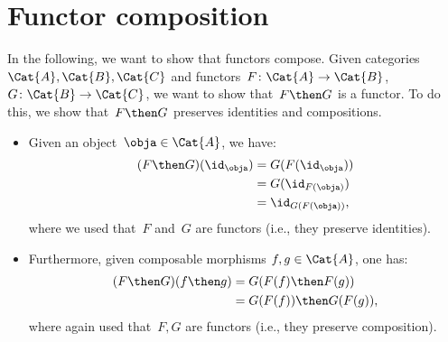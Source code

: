 

\section{Functor composition}


In the following, we want to show that functors compose.
Given categories~$\Cat{A},\Cat{B},\Cat{C}$ and functors~$F\colon \Cat{A}\to \Cat{B}$,~$G\colon \Cat{B}\to \Cat{C}$, we want to show that~$F\then G$ is a functor. To do this, we show that~$F\then G$ preserves identities and compositions.
\begin{itemize}
    \item Given an object~$\obja\in \Cat{A}$, we have:
    \begin{equation*}
        \begin{aligned}
        (F\then G)(\id_\obja)
            &=G(F(\id_\obja))\\
            &=G(\id_{F(\obja)})\\
            &=\id_{G(F(\obja))},
        \end{aligned}
    \end{equation*}
    where we used that~$F$ and~$G$ are functors (i.e., they preserve identities).
    \item Furthermore, given composable morphisms $f,g\in \Cat{A}$, one has:
    \begin{equation*}
        \begin{aligned}
        (F\then G)(f\then g)
            &=G(F(f)\then F(g))\\
            &=G(F(f))\then G(F(g)),
        \end{aligned}
    \end{equation*}
    where again used that~$F,G$ are functors (i.e., they preserve composition).
\end{itemize}



